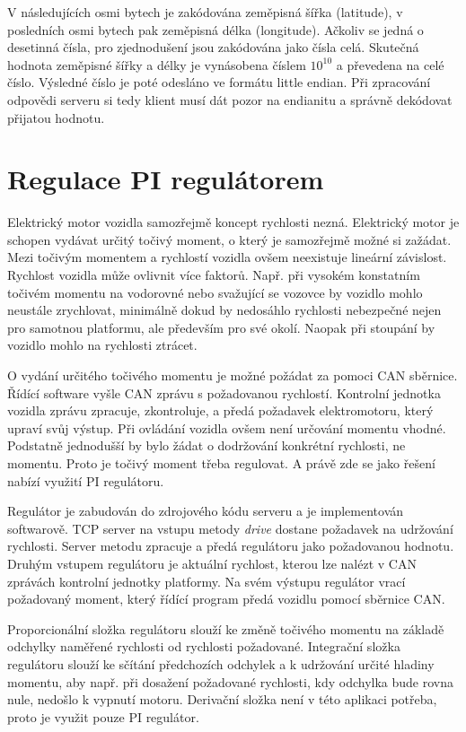 \documentclass[czech, bachelor]{diploma}
\begin{document}
V následujících osmi bytech je zakódována zeměpisná šířka (latitude), v posledních osmi bytech pak zeměpisná délka (longitude).
Ačkoliv se jedná o desetinná čísla, pro zjednodušení jsou zakódována jako čísla celá. Skutečná hodnota zeměpisné šířky a délky
je vynásobena číslem $10^{10}$ a převedena na celé číslo. Výsledné číslo je poté odesláno ve formátu little endian. Při zpracování
odpovědi serveru si tedy klient musí dát pozor na endianitu a správně dekódovat přijatou hodnotu.

\section{Regulace PI regulátorem} \label{pi-controller}
Elektrický motor vozidla samozřejmě koncept rychlosti nezná. Elektrický motor je schopen vydávat určitý točivý moment, o který
je samozřejmě možné si zažádat. Mezi točivým momentem a rychlostí vozidla ovšem neexistuje lineární závislost. Rychlost vozidla
může ovlivnit více faktorů. Např. při vysokém konstatním točivém momentu na vodorovné nebo svažující se vozovce by vozidlo mohlo
neustále zrychlovat, minimálně dokud by nedosáhlo rychlosti nebezpečné nejen pro samotnou platformu, ale především pro své okolí.
Naopak při stoupání by vozidlo mohlo na rychlosti ztrácet.

O vydání určitého točivého momentu je možné požádat za pomoci CAN sběrnice. Řídící software vyšle CAN zprávu s požadovanou
rychlostí. Kontrolní jednotka vozidla zprávu zpracuje, zkontroluje, a předá požadavek elektromotoru, který upraví svůj výstup.
Při ovládání vozidla ovšem není určování momentu vhodné. Podstatně jednodušší by bylo žádat o dodržování konkrétní rychlosti,
ne momentu. Proto je točivý moment třeba regulovat. A právě zde se jako řešení nabízí využití PI regulátoru.

Regulátor je zabudován do zdrojového kódu serveru a je implementován softwarově. TCP server na vstupu metody \emph{drive} dostane
požadavek na udržování rychlosti. Server metodu zpracuje a předá regulátoru jako požadovanou hodnotu. Druhým vstupem regulátoru
je aktuální rychlost, kterou lze nalézt v CAN zprávách kontrolní jednotky platformy. Na svém výstupu regulátor vrací požadovaný
moment, který řídící program předá vozidlu pomocí sběrnice CAN.

Proporcionální složka regulátoru slouží ke změně točivého momentu na základě odchylky naměřené rychlosti od rychlosti požadované.
Integrační složka regulátoru slouží ke sčítání předchozích odchylek a k udržování určité hladiny momentu, aby např. při dosažení
požadované rychlosti, kdy odchylka bude rovna nule, nedošlo k vypnutí motoru. Derivační složka není v této aplikaci potřeba, proto
je využit pouze PI regulátor.
\end{document}
